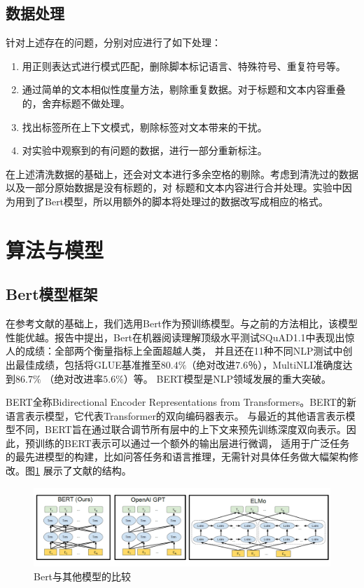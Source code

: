 \documentclass[11pt]{article}
\begin{document}
\subsection{数据处理}
针对上述存在的问题，分别对应进行了如下处理：
\begin{enumerate}[label=(\roman*)]
    \item 用正则表达式进行模式匹配，删除脚本标记语言、特殊符号、重复符号等。
    \item 通过简单的文本相似性度量方法，剔除重复数据。对于标题和文本内容重叠的，舍弃标题不做处理。
    \item 找出标签所在上下文模式，剔除标签对文本带来的干扰。
    \item 对实验中观察到的有问题的数据，进行一部分重新标注。
\end{enumerate}
\par
在上述清洗数据的基础上，还会对文本进行多余空格的剔除。考虑到清洗过的数据以及一部分原始数据是没有标题的，对%
标题和文本内容进行合并处理。实验中因为用到了Bert模型，所以用额外的脚本将处理过的数据改写成相应的格式。

\section{算法与模型}
\subsection{Bert模型框架}
在参考文献\cite{devlin2018bert}\cite{2019albert}的基础上，我们选用Bert作为预训练模型。与之前的方法相比，该模型%
性能优越。报告\cite{devlin2018bert}中提出，Bert在机器阅读理解顶级水平测试SQuAD1.1中表现出惊人的成绩：全部两个衡量指标上全面超越人类，%
并且还在11种不同NLP测试中创出最佳成绩，包括将GLUE基准推至$80.4\%$（绝对改进7.6％），MultiNLI准确度达到$86.7\%$ （绝对改进率$5.6\%$）等。%
BERT模型是NLP领域发展的重大突破。\par

BERT全称Bidirectional Encoder Representations from Transformers。BERT的新语言表示模型，它代表Transformer的双向编码器表示。%
与最近的其他语言表示模型不同，BERT旨在通过联合调节所有层中的上下文来预先训练深度双向表示。因此，预训练的BERT表示可以通过一个额外的输出层进行微调，%
适用于广泛任务的最先进模型的构建，比如问答任务和语言推理，无需针对具体任务做大幅架构修改。图\ref{Comp_Bert} 展示了文献\cite{devlin2018bert}的结构。\par

\begin{figure}[!ht]
    \centering
    \includegraphics[width=\linewidth]{pic/Bert.png}
    \caption{Bert与其他模型的比较}
    \label{Comp_Bert}
\end{figure}
\end{document}
